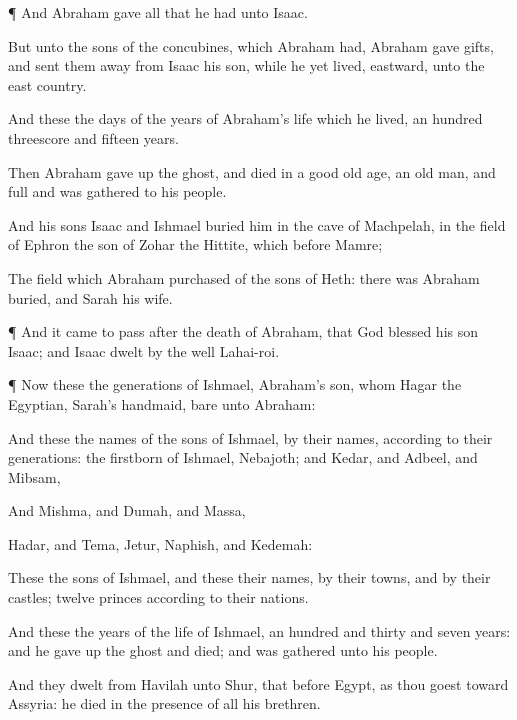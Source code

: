 {\par }{\PP {}¶ And
Abraham
gave all that he had unto
Isaac.

But unto the
sons of the
concubines, which
Abraham had,
Abraham
gave
gifts, and sent them
away from
Isaac his
son, while he yet
lived,
eastward, unto the
east
country.

And these
{} the
days of the
years of
Abraham’s
life which he
lived, an
hundred threescore and
fifteen
years.

Then
Abraham gave up the
ghost, and
died in a
good old
age, an old
man, and
full
{} and was
gathered to his
people.

And his
sons
Isaac and
Ishmael
buried him in the
cave of
Machpelah, in the
field of
Ephron the
son of
Zohar the
Hittite, which
{}
before
Mamre;

The
field which
Abraham
purchased of the
sons of
Heth: there was
Abraham
buried, and
Sarah his
wife.


\par }{\PP {}¶ And it came to pass
after the
death of
Abraham, that
God
blessed his
son
Isaac; and
Isaac
dwelt
by the well
Lahai-roi.


\par }{\PP {}¶ Now these
{} the
generations of
Ishmael,
Abraham’s
son, whom
Hagar the
Egyptian,
Sarah’s
handmaid,
bare unto
Abraham:

And these
{} the
names of the
sons of
Ishmael, by their
names, according to their
generations: the
firstborn of
Ishmael,
Nebajoth; and
Kedar, and
Adbeel, and
Mibsam,

And
Mishma, and
Dumah, and
Massa,

Hadar, and
Tema,
Jetur,
Naphish, and
Kedemah:

These
{} the
sons of
Ishmael, and these
{} their
names, by their
towns, and by their
castles;
twelve
princes according to their
nations.

And these
{} the
years of the
life of
Ishmael, an
hundred and
thirty and
seven
years: and he gave up the
ghost and
died; and was
gathered unto his
people.

And they
dwelt from
Havilah unto
Shur, that
{}
before
Egypt, as thou
goest toward
Assyria:
{} he
died in the
presence of all his
brethren.


}
